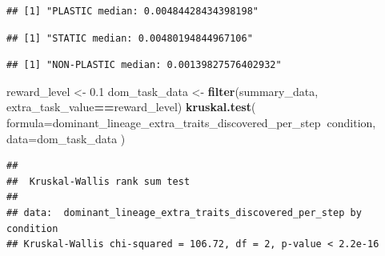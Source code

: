 \documentclass[]{book}
\newenvironment{Shaded}{\begin{snugshade}}{\end{snugshade}}
\newcommand{\DataTypeTok}[1]{\textcolor[rgb]{0.13,0.29,0.53}{#1}}
\newcommand{\FloatTok}[1]{\textcolor[rgb]{0.00,0.00,0.81}{#1}}
\newcommand{\KeywordTok}[1]{\textcolor[rgb]{0.13,0.29,0.53}{\textbf{#1}}}
\newcommand{\NormalTok}[1]{#1}
\newcommand{\OperatorTok}[1]{\textcolor[rgb]{0.81,0.36,0.00}{\textbf{#1}}}
\newcommand{\StringTok}[1]{\textcolor[rgb]{0.31,0.60,0.02}{#1}}
\begin{document}
\begin{verbatim}
## [1] "PLASTIC median: 0.00484428434398198"
\end{verbatim}

\begin{Shaded}
\end{Shaded}

\begin{verbatim}
## [1] "STATIC median: 0.00480194844967106"
\end{verbatim}

\begin{Shaded}
\end{Shaded}

\begin{verbatim}
## [1] "NON-PLASTIC median: 0.00139827576402932"
\end{verbatim}

\begin{Shaded}
\begin{Highlighting}[]
\NormalTok{reward_level <-}\StringTok{ }\FloatTok{0.1}
\NormalTok{dom_task_data <-}\StringTok{ }\KeywordTok{filter}\NormalTok{(summary_data, extra_task_value}\OperatorTok{==}\NormalTok{reward_level)}
\KeywordTok{kruskal.test}\NormalTok{(}
  \DataTypeTok{formula=}\NormalTok{dominant_lineage_extra_traits_discovered_per_step}\OperatorTok{~}\NormalTok{condition,}
  \DataTypeTok{data=}\NormalTok{dom_task_data}
\NormalTok{)}
\end{Highlighting}
\end{Shaded}

\begin{verbatim}
## 
##  Kruskal-Wallis rank sum test
## 
## data:  dominant_lineage_extra_traits_discovered_per_step by condition
## Kruskal-Wallis chi-squared = 106.72, df = 2, p-value < 2.2e-16
\end{verbatim}
\end{document}
